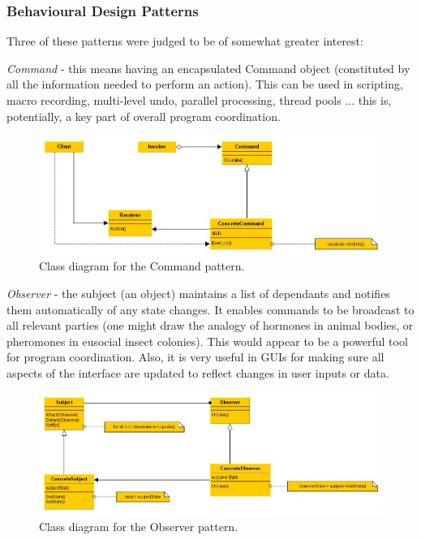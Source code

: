\subsubsection*{Behavioural Design Patterns}

Three of these patterns were judged to be of somewhat greater interest:

{\it Command} - this means having an encapsulated Command object (constituted by all the information needed to perform an action).  This can be used in scripting, macro recording, multi-level undo, parallel processing, thread pools ... this is, potentially, a key part of overall program coordination.

\begin{figure}
\begin{centering}
\includegraphics[width=12cm]{../png/command.jpg}
\end{centering}
\caption{Class diagram for the Command pattern.\label{fig:command}}
\end{figure}

{\it Observer} - the subject (an object) maintains a list of dependants and notifies them automatically of any state changes.
It enables commands to be broadcast to all relevant parties (one might draw the analogy of hormones in animal bodies, or pheromones in eusocial insect colonies).  This would appear to be a powerful tool for program coordination.
Also, it is very useful in GUIs for making sure all aspects of the interface are updated to reflect changes in user inputs or data.

\begin{figure}
\begin{centering}
\includegraphics[width=12cm]{../png/observer.jpg}
\end{centering}
\caption{Class diagram for the Observer pattern.\label{fig:observer}}
\end{figure}

